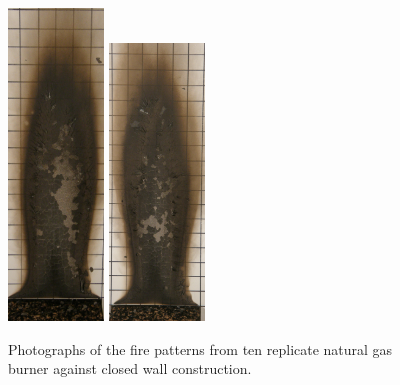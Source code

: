 \documentclass[twoside]{uocthesis}
\begin{document}
\begin{figure}[p]
	\includegraphics[width=1.0in]{../Figures/GBNG22_P5130403}
	\includegraphics[width=1.0in]{../Figures/GBNG23_P5130412} \\

	\caption[Photographs of the fire patterns from ten replicate natural gas burner against closed wall construction]{Photographs of the fire patterns from ten replicate natural gas burner against closed wall construction.}
	\label{NG_Closed_Wall}
\end{figure}
\end{document}
